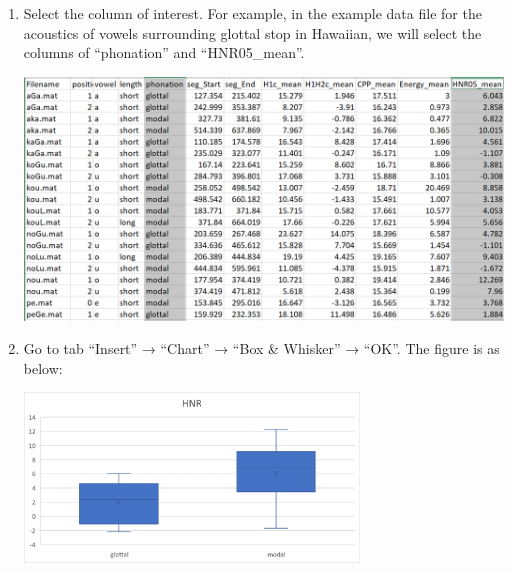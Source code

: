 \documentclass[
]{article}
\providecommand{\tightlist}{%
  \setlength{\itemsep}{0pt}\setlength{\parskip}{0pt}}
\begin{document}
\begin{enumerate}
\def\labelenumi{\arabic{enumi}.}
\tightlist
\item
  Select the column of interest. For example, in the example data file
  for the acoustics of vowels surrounding glottal stop in Hawaiian, we
  will select the columns of ``phonation'' and ``HNR05\_mean''.

  \includegraphics[width=1\textwidth,height=\textheight]{image/vs_selectcolumn_excel.png}
\item
  Go to tab ``Insert'' → ``Chart'' → ``Box \& Whisker'' → ``OK''. The
  figure is as below:

  \includegraphics[width=0.7\textwidth,height=\textheight]{image/vs_samplehnrgraph.png}
\end{enumerate}
\end{document}

